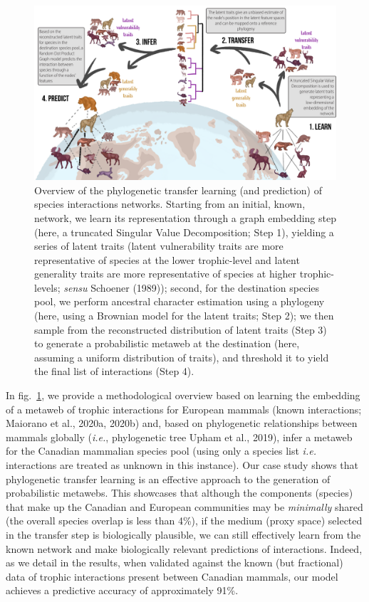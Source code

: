 \documentclass[11pt]{article}
\makeatletter
\def\maxwidth{\ifdim\Gin@nat@width>\linewidth\linewidth
\else\Gin@nat@width\fi}
\let\Oldincludegraphics\includegraphics
\renewcommand{\includegraphics}[1]{\Oldincludegraphics[width=\maxwidth]{#1}}
\makeatother
\begin{document}
\begin{figure}
\hypertarget{fig:concept}{%
\centering
\includegraphics{figures/figure-concept_v2.png}
\caption{Overview of the phylogenetic transfer learning (and prediction)
of species interactions networks. Starting from an initial, known,
network, we learn its representation through a graph embedding step
(here, a truncated Singular Value Decomposition; Step 1), yielding a
series of latent traits (latent vulnerability traits are more
representative of species at the lower trophic-level and latent
generality traits are more representative of species at higher
trophic-levels; \emph{sensu} Schoener (1989)); second, for the
destination species pool, we perform ancestral character estimation
using a phylogeny (here, using a Brownian model for the latent traits;
Step 2); we then sample from the reconstructed distribution of latent
traits (Step 3) to generate a probabilistic metaweb at the destination
(here, assuming a uniform distribution of traits), and threshold it to
yield the final list of interactions (Step 4).}\label{fig:concept}
}
\end{figure}

In fig.~\ref{fig:concept}, we provide a methodological overview based on
learning the embedding of a metaweb of trophic interactions for European
mammals (known interactions; Maiorano et al., 2020a, 2020b) and, based
on phylogenetic relationships between mammals globally (\emph{i.e.},
phylogenetic tree Upham et al., 2019), infer a metaweb for the Canadian
mammalian species pool (using only a species list \emph{i.e.}
interactions are treated as unknown in this instance). Our case study
shows that phylogenetic transfer learning is an effective approach to
the generation of probabilistic metawebs. This showcases that although
the components (species) that make up the Canadian and European
communities may be \emph{minimally} shared (the overall species overlap
is less than 4\%), if the medium (proxy space) selected in the transfer
step is biologically plausible, we can still effectively learn from the
known network and make biologically relevant predictions of
interactions. Indeed, as we detail in the results, when validated
against the known (but fractional) data of trophic interactions present
between Canadian mammals, our model achieves a predictive accuracy of
approximately 91\%.
\end{document}
